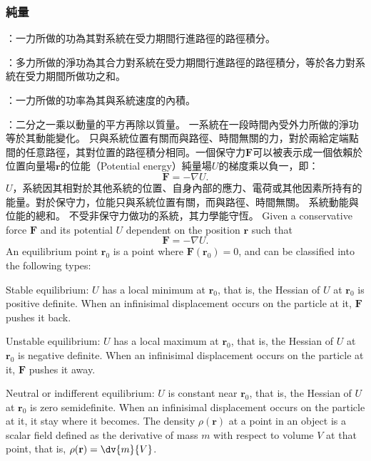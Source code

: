 \documentclass[a4paper,12pt]{article}
\begin{document}
\subsubsection{純量}
\bit
\item{}：一力所做的功為其對系統在受力期間行進路徑的路徑積分。
\item{}：多力所做的淨功為其合力對系統在受力期間行進路徑的路徑積分，等於各力對系統在受力期間所做功之和。
\item{}：一力所做的功率為其與系統速度的內積。
\item{}：二分之一乘以動量的平方再除以質量。
\ei
{}
一系統在一段時間內受外力所做的淨功等於其動能變化。
只與系統位置有關而與路徑、時間無關的力，對於兩給定端點間的任意路徑，其對位置的路徑積分相同。一個保守力$\mathbf{F}$可以被表示成一個依賴於位置向量場$\mathbf{r}$的位能（Potential energy）純量場$U$的梯度乘以負一，即：
\[\mathbf{F}=-\nabla U.\]
$U$，系統因其相對於其他系統的位置、自身內部的應力、電荷或其他因素所持有的能量。對於保守力，位能只與系統位置有關，而與路徑、時間無關。
系統動能與位能的總和。
不受非保守力做功的系統，其力學能守恆。
Given a conservative force $\mathbf{F}$ and its potential $U$ dependent on the position $\mathbf{r}$ such that
\[\mathbf{F}=-\nabla U.\]
An equilibrium point $\mathbf{r}_0$ is a point where $\mathbf{F}(\mathbf{r}_0)=0$, and can be classified into the following types:
\bit
\item Stable equilibrium: $U$ has a local minimum at $\mathbf{r}_0$, that is, the Hessian of $U$ at $\mathbf{r}_0$ is positive definite. When an infinisimal displacement occurs on the particle at it, $\mathbf{F}$ pushes it back.
\item Unstable equilibrium: $U$ has a local maximum at $\mathbf{r}_0$, that is, the Hessian of $U$ at $\mathbf{r}_0$ is negative definite. When an infinisimal displacement occurs on the particle at it, $\mathbf{F}$ pushes it away.
\item Neutral or indifferent equilibrium: $U$ is constant near $\mathbf{r}_0$, that is, the Hessian of $U$ at $\mathbf{r}_0$ is zero semidefinite. When an infinisimal displacement occurs on the particle at it, it stay where it becomes.
\eit
{}
The density $\rho(\mathbf{r})$ at a point in an object is a scalar field defined as the derivative of mass $m$ with respect to volume $V$ at that point, that is, $\rho(\mathbf{r})=\dv{m}{V}$.
\end{document}
